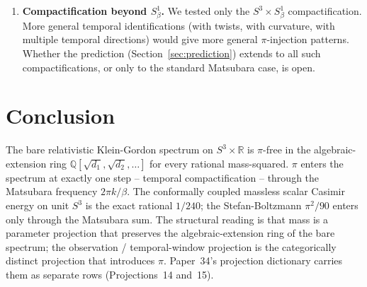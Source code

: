 \documentclass[11pt]{article}
\begin{document}
\begin{enumerate}
Sprint LS-8a (May 2026) closed the strong-test attempt with a
negative.  A model two-loop sum on the Dirac spectrum of $S^3$
(rainbow plus crossed topologies, $\mathrm{SO}(4)$ channel counts at
four vertices, external level $n_\text{ext} = 1$ standing in for
hydrogen $2S$; no bound-state wavefunction enters) grows without bound
with its cutoff (local log-log slope $2.8$ between $n_\text{max} = 5$
and $6$; Paper~36~\S~6).  A finite two-loop coefficient requires
$Z_2$ and $\delta m$ renormalization counterterms, which the model
does not contain and the bare CC spectral action does not generate.  This places
a clean scope boundary between the finite one-loop Bethe-logarithm
sector (Paper~36, whose sub-percent headline is the leading one-loop
assembly with literature logarithms, the one-loop $\alpha(Z\alpha)^5$
term not included) and multi-loop QED (requires renormalization
machinery the framework does not natively produce).
\textbf{Scope of Prediction~1 in QED:} the prediction concerns the
$\pi$ content of the \emph{finite parts} of QED observables; UV
divergences of multi-loop contributions are inherited from the
underlying field theory and renormalized by counterterms that the
framework does not autonomously generate.  This narrows the original
Prediction~\ref{pred:pi_iff_temporal}:
$\pi$ enters via temporal integration; renormalization is a separate
projection not yet in the Paper~34 catalogue.

\item \textbf{Compactification beyond $S^1_\beta$.}  We tested only the
$S^3 \times S^1_\beta$ compactification.  More general temporal
identifications (with twists, with curvature, with multiple temporal
directions) would give more general $\pi$-injection patterns.  Whether
the prediction (Section~\ref{sec:prediction}) extends to all such
compactifications, or only to the standard Matsubara case, is open.

\end{enumerate}

\section{Conclusion}
\label{sec:conclusion}

The bare relativistic Klein-Gordon spectrum on $S^3 \times \mathbb{R}$
is $\pi$-free in the algebraic-extension ring
$\mathbb{Q}[\sqrt{d_1}, \sqrt{d_2}, \ldots]$ for every rational
mass-squared.  $\pi$ enters the spectrum at exactly one step --
temporal compactification -- through the Matsubara frequency
$2\pi k / \beta$.  The conformally coupled massless scalar Casimir
energy on unit $S^3$ is the exact rational $1/240$; the Stefan-Boltzmann
$\pi^2/90$ enters only through the Matsubara sum.  The structural
reading is that mass is a parameter projection that preserves the
algebraic-extension ring of the bare spectrum; the observation /
temporal-window projection is the categorically distinct projection
that introduces $\pi$.  Paper~34's projection dictionary carries them
as separate rows (Projections~14 and~15).
\end{document}
